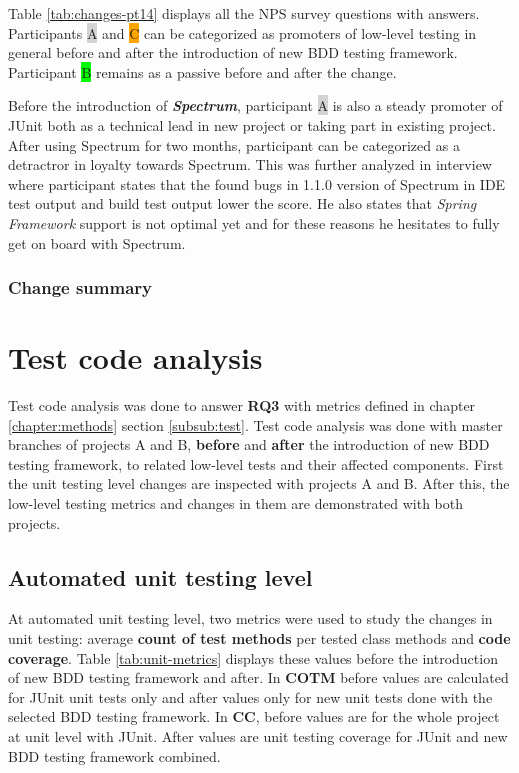 Table \ref{tab:changes-pt14} displays all the NPS survey questions with answers.
Participants {\colorbox{lightgray}A} and {\colorbox{orange}C} can be categorized as promoters of low-level testing
in general before and after the introduction of new BDD testing framework. Participant {\colorbox{lime}B} remains as a
passive before and after the change.

Before the introduction of \textbf{\textit{Spectrum}}, participant {\colorbox{lightgray}A}
is also a steady promoter of JUnit both as a technical lead in new project or taking part in existing project. After
using Spectrum for two months, participant can be categorized as a detractror in loyalty towards Spectrum. This was further
analyzed in interview where participant states that the found bugs in 1.1.0 version of Spectrum in IDE test output and build test output
lower the score. He also states that \textit{Spring Framework} support is not optimal yet and for these reasons he hesitates
to fully get on board with Spectrum.

    \clearpage

\subsubsection{Change summary}

\section{Test code analysis}
Test code analysis was done to answer \textbf{RQ3} with metrics defined in chapter \ref{chapter:methods} section \ref{subsub:test}.
Test code analysis was done with master branches of projects A and B, \textbf{before} and \textbf{after} the introduction of new BDD testing framework, to related
low-level tests and their affected components. First the unit testing level changes are inspected with projects A and B.
After this, the low-level testing metrics and changes in them are demonstrated with both projects.

\subsection{Automated unit testing level}
\label{subsub:unit-level-metrics}
At automated unit testing level, two metrics were used to study the changes in unit testing: average \textbf{count of test methods}
per tested class methods and \textbf{code coverage}. Table \ref{tab:unit-metrics} displays these values before the introduction
of new BDD testing framework and after. In \textbf{COTM} before values are calculated for JUnit unit tests only and after
values only for new unit tests done with the selected BDD testing framework. In \textbf{CC}, before values are for the
whole project at unit level with JUnit. After values are unit testing coverage for JUnit and new BDD testing framework
combined.

